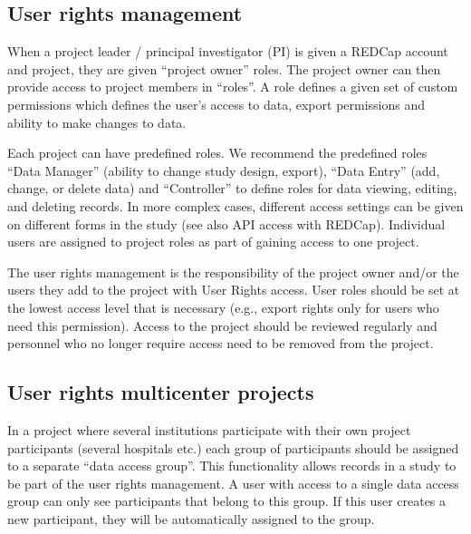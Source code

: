 \documentclass[letterpaper,10pt,english]{sphinxmanual}
\begin{document}
\subsection{User rights management}
\label{\detokenize{ServerAdmin/admin:user-rights-management}}
\sphinxAtStartPar
When a project leader / principal investigator (PI) is given a REDCap account and project, they are given “project owner” roles. The project owner can then provide access to project members in “roles”. A role defines a given set of custom permissions which defines the user’s access to data, export permissions and ability to make changes to data.

\sphinxAtStartPar
Each project can have predefined roles. We recommend the predefined roles “Data Manager” (ability to change study design, export), “Data Entry” (add, change, or delete data) and “Controller” to define roles for data viewing, editing, and deleting records. In more complex cases, different access settings can be given on different forms in the study (see also API access with REDCap). Individual users are assigned to project roles as part of gaining access to one project.

\sphinxAtStartPar
The user rights management is the responsibility of the project owner and/or the users they add to the project with User Rights access. User roles should be set at the lowest access level that is necessary (e.g., export rights only for users who need this permission). Access to the project should be reviewed regularly and personnel who no longer require access need to be removed from the project.


\subsection{User rights \textendash{} multi\sphinxhyphen{}center projects}
\label{\detokenize{ServerAdmin/admin:user-rights-multi-center-projects}}
\sphinxAtStartPar
In a project where several institutions participate with their own project participants (several hospitals etc.) each group of participants should be assigned to a separate “data access group”. This functionality allows records in a study to be part of the user rights management. A user with access to a single data access group can only see participants that belong to this group. If this user creates a new participant, they will be automatically assigned to the group.
\end{document}
